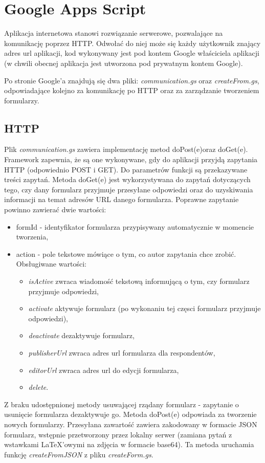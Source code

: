 \section{Google Apps Script}
Aplikacja internetowa stanowi rozwiązanie serwerowe, pozwalające na komunikację poprzez HTTP. Odwołać do niej może się każdy użytkownik znający adres url aplikacji, kod wykonywany jest pod kontem Google właściciela aplikacji (w chwili obecnej aplikacja jest utworzona pod prywatnym kontem Google).

\ind Po stronie Google'a znajdują się dwa pliki: \textit{communication.gs} oraz \textit{createFrom.gs}, odpowiadające kolejno za komunikację po HTTP oraz za zarządzanie tworzeniem formularzy. 
\subsection{HTTP}
Plik \textit{communication.gs} zawiera implementację metod doPost(e)oraz doGet(e). Framework zapewnia, że są one wykonywane, gdy do aplikacji przyjdą zapytania HTTP (odpowiednio POST i GET). Do parametrów funkcji są przekazywane treści zapytań.
\ind Metoda doGet(e) jest wykorzystywana do zapytań dotyczących tego, czy dany formularz przyjmuje przesyłane odpowiedzi oraz do uzyskiwania informacji na temat adresów URL danego formularza.  Poprawne zapytanie powinno zawierać dwie wartości:
\begin{itemize}
\item formId - identyfikator formularza przypisywany automatycznie w momencie tworzenia,
\item action - pole tekstowe mówiące o tym, co autor zapytania chce zrobić. Obsługiwane wartości:
\begin{itemize}
\item \textit{isActive} zwraca wiadomość tekstową informującą o tym, czy formularz przyjmuje odpowiedzi,
\item \textit{activate} aktywuje formularz (po wykonaniu tej częsci formularz przyjmuje odpowiedzi),
\item \textit{deactivate} dezaktywuje formularz,
\item \textit{publisherUrl} zwraca adres url formularza dla respondentów,
\item \textit{editorUrl} zwraca adres url do edycji formularza,
\item \textit{delete}.
\end{itemize}
\end{itemize}
Z braku udostępnionej metody usuwającej rządany formularz - zapytanie o usunięcie formularza dezaktywuje go. 
\ind Metoda doPost(e) odpowiada  za tworzenie nowych formularzy. Przesyłana zawartość zawiera zakodowany w formacie JSON formularz, wstępnie przetworzony przez lokalny serwer (zamiana pytań z wstawkami \LaTeX{}'owymi na zdjęcia w formacie base64). Ta metoda uruchamia funkcję \textit{createFromJSON} z pliku \textit{createForm.gs}.
